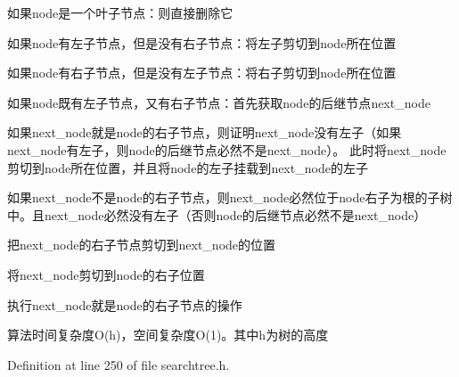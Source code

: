 \begin{DoxyItemize}
\item 如果{\ttfamily node}是一个叶子节点：则直接删除它
\item 如果{\ttfamily node}有左子节点，但是没有右子节点：将左子剪切到{\ttfamily node}所在位置
\item 如果{\ttfamily node}有右子节点，但是没有左子节点：将右子剪切到{\ttfamily node}所在位置
\item 如果{\ttfamily node}既有左子节点，又有右子节点：首先获取{\ttfamily node}的后继节点{\ttfamily next\+\_\+node}
\begin{DoxyItemize}
\item 如果{\ttfamily next\+\_\+node}就是{\ttfamily node}的右子节点，则证明{\ttfamily next\+\_\+node}没有左子（如果{\ttfamily next\+\_\+node}有左子，则{\ttfamily node}的后继节点必然不是{\ttfamily next\+\_\+node}）。 此时将{\ttfamily next\+\_\+node}剪切到{\ttfamily node}所在位置，并且将{\ttfamily node}的左子挂载到{\ttfamily next\+\_\+node}的左子
\item 如果{\ttfamily next\+\_\+node}不是{\ttfamily node}的右子节点，则{\ttfamily next\+\_\+node}必然位于{\ttfamily node}右子为根的子树中。且{\ttfamily next\+\_\+node}必然没有左子（否则{\ttfamily node}的后继节点必然不是{\ttfamily next\+\_\+node}）
\begin{DoxyItemize}
\item 把{\ttfamily next\+\_\+node}的右子节点剪切到{\ttfamily next\+\_\+node}的位置
\item 将{\ttfamily next\+\_\+node}剪切到{\ttfamily node}的右子位置
\item 执行{\ttfamily next\+\_\+node}就是{\ttfamily node}的右子节点的操作
\end{DoxyItemize}
\end{DoxyItemize}
\end{DoxyItemize}

算法时间复杂度\+O(h)，空间复杂度\+O(1)。其中h为树的高度 

Definition at line 250 of file searchtree.\+h.

\hypertarget{class_introduction_to_algorithm_1_1_tree_algorithm_1_1_search_tree_affaf44d28dc2180f93669cb8d6c09c84}{}
